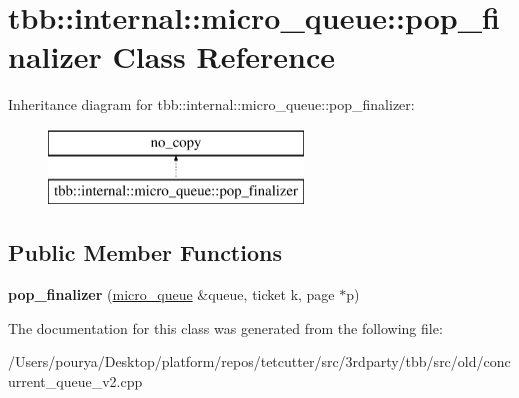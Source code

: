 \hypertarget{classtbb_1_1internal_1_1micro__queue_1_1pop__finalizer}{}\section{tbb\+:\+:internal\+:\+:micro\+\_\+queue\+:\+:pop\+\_\+finalizer Class Reference}
\label{classtbb_1_1internal_1_1micro__queue_1_1pop__finalizer}
Inheritance diagram for tbb\+:\+:internal\+:\+:micro\+\_\+queue\+:\+:pop\+\_\+finalizer\+:\begin{figure}[H]
\begin{center}
\leavevmode
\includegraphics[height=2.000000cm]{classtbb_1_1internal_1_1micro__queue_1_1pop__finalizer}
\end{center}
\end{figure}
\subsection*{Public Member Functions}
\begin{DoxyCompactItemize}
\item 
\hypertarget{classtbb_1_1internal_1_1micro__queue_1_1pop__finalizer_a6c6640391cc56397efe0c2116ff5e0a4}{}{\bfseries pop\+\_\+finalizer} (\hyperlink{structtbb_1_1internal_1_1micro__queue}{micro\+\_\+queue} \&queue, ticket k, page $\ast$p)\label{classtbb_1_1internal_1_1micro__queue_1_1pop__finalizer_a6c6640391cc56397efe0c2116ff5e0a4}

\end{DoxyCompactItemize}


The documentation for this class was generated from the following file\+:\begin{DoxyCompactItemize}
\item 
/\+Users/pourya/\+Desktop/platform/repos/tetcutter/src/3rdparty/tbb/src/old/concurrent\+\_\+queue\+\_\+v2.\+cpp\end{DoxyCompactItemize}
